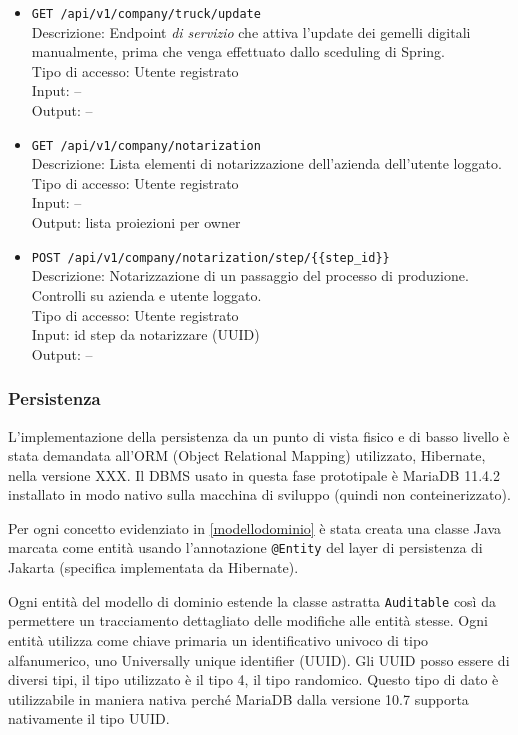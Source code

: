 \documentclass[a4paper,11pt]{article}
\begin{document}
\begin{itemize}
  \item \texttt{GET /api/v1/company/truck/update}
        \\ Descrizione: Endpoint \textit{di servizio} che attiva l'update dei gemelli digitali manualmente, prima che venga effettuato dallo sceduling di Spring.
        \\ Tipo di accesso: Utente registrato
        \\ Input: --
        \\ Output: --

  \item \texttt{GET /api/v1/company/notarization}
        \\ Descrizione: Lista elementi di notarizzazione dell'azienda dell'utente loggato.
        \\ Tipo di accesso: Utente registrato
        \\ Input: --
        \\ Output: lista proiezioni per owner

  \item \texttt{POST /api/v1/company/notarization/step/\{\{step\_id\}\}}
        \\ Descrizione: Notarizzazione di un passaggio del processo di produzione. Controlli su azienda e utente loggato.
        \\ Tipo di accesso: Utente registrato
        \\ Input: id step da notarizzare (UUID)
        \\ Output: --

\end{itemize}

\subsubsection{Persistenza}

L'implementazione della persistenza da un punto di vista fisico e di basso livello è stata demandata all'ORM (Object Relational Mapping) utilizzato, Hibernate, nella versione XXX. Il DBMS usato in questa fase prototipale è MariaDB 11.4.2 installato in modo nativo sulla macchina di sviluppo (quindi non conteinerizzato).

Per ogni concetto evidenziato in \ref{modellodominio} è stata creata una classe Java marcata come entità usando l'annotazione \texttt{@Entity} del layer di persistenza di Jakarta (specifica implementata da Hibernate).

Ogni entità del modello di dominio estende la classe astratta \texttt{Auditable} così da permettere un tracciamento dettagliato delle modifiche alle entità stesse.
Ogni entità utilizza come chiave primaria un identificativo univoco di tipo alfanumerico, uno Universally unique identifier (UUID). Gli UUID posso essere di diversi tipi, il tipo utilizzato è il tipo 4, il tipo randomico. Questo tipo di dato è utilizzabile in maniera nativa perché MariaDB dalla versione 10.7 \cite{mariadbUUIDData} supporta nativamente il tipo UUID.
\end{document}
